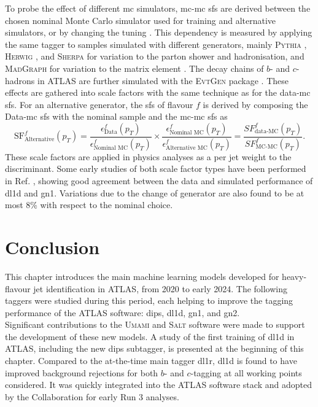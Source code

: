 To probe the effect of different \gls{mc} simulators, \gls{mc}-\gls{mc} \glspl{sf} are derived between the chosen nominal Monte Carlo simulator used for training and alternative simulators, or by changing the tuning \cite{ATL-PHYS-PUB-2020-009}. This dependency is measured by applying the same tagger to samples simulated with different generators, mainly \textsc{Pythia} \cite{SJOSTRAND2015159}, \textsc{Herwig} \cite{bellm2017herwig}, and \textsc{Sherpa} \cite{sherpa2.2paper} for variation to the parton shower and hadronisation, and \textsc{MadGraph} for variation to the matrix element \cite{madgraph}. The decay chains of $b$- and $c$-hadrons in ATLAS are further simulated with the \textsc{EvtGen} package \cite{LANGE2001152}. These effects are gathered into scale factors with the same technique as for the data-\gls{mc} \glspl{sf}. For an alternative generator, the \glspl{sf} of flavour $f$ is derived by composing the Data-\gls{mc} \glspl{sf} with the nominal sample and the \gls{mc}-\gls{mc} \glspl{sf} as \[\textrm{SF}^f_{\textrm{Alternative}}(p_T) = \frac{\epsilon^f_{\textrm{Data}}(p_T)}{\epsilon^f_{\textrm{Nominal MC}}(p_T)} \times \frac{\epsilon^f_{\textrm{Nominal MC}}(p_T)}{\epsilon^f_{\textrm{Alternative MC}}(p_T)} = \frac{SF^f_{\textrm{data-MC}}(p_T)}{SF^f_{\textrm{MC-MC}}(p_T)}.\] These scale factors are applied in physics analyses as a per jet weight to the discriminant. Some early studies of both scale factor types have been performed in Ref. \cite{ATL-PLOT-FTAG-2023-01}, showing good agreement between the data and simulated performance of \gls{dl1d} and \gls{gn1}. Variations due to the change of generator are also found to be at most 8\% with respect to the nominal choice.

\section{Conclusion}
This chapter introduces the main machine learning models developed for heavy-flavour jet identification in ATLAS, from 2020 to early 2024. The following taggers were studied during this period, each helping to improve the tagging performance of the ATLAS software: \gls{dips}, \gls{dl1d}, \gls{gn1}, and \gls{gn2}. \\

Significant contributions to the \textsc{Umami} \cite{UmamiCite} and \textsc{Salt} \cite{SaltCite} software were made to support the development of these new models. A study of the first training of \gls{dl1d} in ATLAS, including the new \gls{dips} subtagger, is presented at the beginning of this chapter. Compared to the at-the-time main tagger \gls{dl1r}, \gls{dl1d} is found to have improved background rejections for both $b$- and $c$-tagging at all working points considered. It was quickly integrated into the ATLAS software stack and adopted by the Collaboration for early Run 3 analyses. \\

